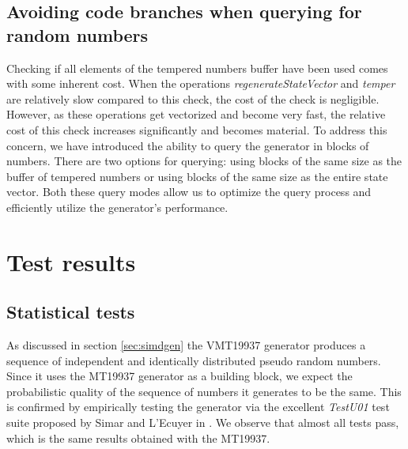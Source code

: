 \documentclass[preprint,1p,times]{elsarticle}
\begin{document}
\subsection{Avoiding code branches when querying for random numbers}
\label{seq:blocks}
\noindent Checking if all elements of the tempered numbers buffer have been used comes with some inherent cost. When the operations \textit{regenerateStateVector} and \textit{temper} are relatively slow compared to this check, the cost of the check is negligible. However, as these operations get vectorized and become very fast, the relative cost of this check increases significantly and becomes material. To address this concern, we have introduced the ability to query the generator in blocks of numbers. There are two options for querying: using blocks of the same size as the buffer of tempered numbers or using blocks of the same size as the entire state vector. Both these query modes allow us to optimize the query process and efficiently utilize the generator's performance.

\section{Test results}

\subsection{Statistical tests}
\noindent As discussed in section \ref{sec:simdgen} the VMT19937 generator produces a sequence of independent and identically distributed pseudo random numbers. Since it uses the MT19937 generator as a building block, we expect the probabilistic quality of the sequence of numbers it generates to be the same. This is confirmed by empirically testing the generator via the excellent \textit{TestU01} test suite proposed by Simar and L'Ecuyer in \cite{testu01}. We observe that almost all tests pass, which is the same results obtained with the MT19937.
\end{document}
